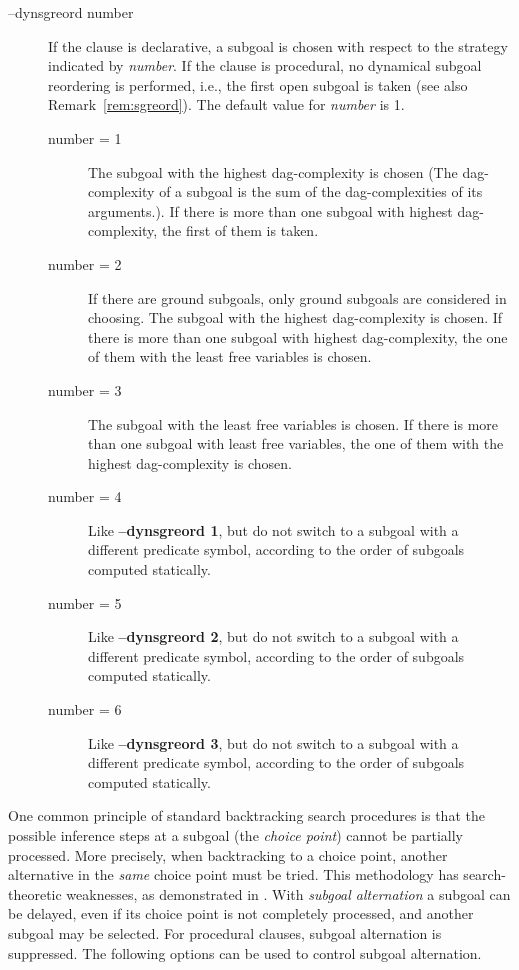 \begin{description}
\item[--dynsgreord \lb number\rb]
      If the clause is declarative, a subgoal is chosen with respect
      to the strategy indicated by {\it number\/}. If the clause is
      procedural, no dynamical subgoal reordering is performed,
      i.e., the first open subgoal is taken (see also
      Remark~\ref{rem:sgreord}).   
      The default value for {\it number\/} is 1.
      \begin{description}
      \item[number = 1]
           {The subgoal with the highest dag-complexity is chosen
            (The dag-complexity of a subgoal is the sum of the
            dag-complexities of its arguments.). If there is more
            than one subgoal with highest dag-complexity, the first of
            them is taken.}
      \item[number = 2] 
           {If there are ground subgoals, only ground subgoals are
            considered in choosing. The subgoal with the highest
            dag-complexity is chosen. If there is more than one
            subgoal with highest dag-complexity, the one of them with
            the least free variables is chosen.}
      \item[number = 3] 
           {The subgoal with the least free variables is chosen. If
            there is more than one subgoal with least free variables,
            the one of them with the highest dag-complexity is chosen.}
      \item[number = 4]
           {Like {\bf --dynsgreord 1}, but do not switch to a subgoal
            with a different predicate symbol, according to the order
            of subgoals computed statically.}
      \item[number = 5]
           {Like {\bf --dynsgreord 2}, but do not switch to a subgoal
            with a different predicate symbol, according to the order
            of subgoals computed statically.}
      \item[number = 6]
           {Like {\bf --dynsgreord 3}, but do not switch to a subgoal
            with a different predicate symbol, according to the order
            of subgoals computed statically.}
      \end{description}
\end{description}

One common principle of standard backtracking search procedures is
that the possible inference steps at a subgoal (the {\em choice
point}) cannot be partially processed.
More precisely, when backtracking to a choice point, another
alternative in the {\em same\/} choice point must be tried. 
This methodology has search-theoretic weaknesses, as demonstrated in
\cite{IL96}.
With {\em subgoal alternation\/} a subgoal can be delayed, even if its
choice point is not completely processed, and another subgoal may be
selected.
For procedural clauses, subgoal alternation is suppressed.
The following options can be used to control subgoal alternation.

